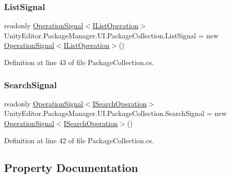 \subsubsection{\texorpdfstring{ListSignal}{ListSignal}}
{\footnotesize\ttfamily readonly \mbox{\hyperlink{class_unity_editor_1_1_package_manager_1_1_u_i_1_1_operation_signal}{Operation\+Signal}}$<$\mbox{\hyperlink{interface_unity_editor_1_1_package_manager_1_1_u_i_1_1_i_list_operation}{I\+List\+Operation}}$>$ Unity\+Editor.\+Package\+Manager.\+U\+I.\+Package\+Collection.\+List\+Signal = new \mbox{\hyperlink{class_unity_editor_1_1_package_manager_1_1_u_i_1_1_operation_signal}{Operation\+Signal}}$<$\mbox{\hyperlink{interface_unity_editor_1_1_package_manager_1_1_u_i_1_1_i_list_operation}{I\+List\+Operation}}$>$()}



Definition at line 43 of file Package\+Collection.\+cs.

\mbox{\label{class_unity_editor_1_1_package_manager_1_1_u_i_1_1_package_collection_a0ae7851281d0246d8c715db1e3b10a63}} 
\subsubsection{\texorpdfstring{SearchSignal}{SearchSignal}}
{\footnotesize\ttfamily readonly \mbox{\hyperlink{class_unity_editor_1_1_package_manager_1_1_u_i_1_1_operation_signal}{Operation\+Signal}}$<$\mbox{\hyperlink{interface_unity_editor_1_1_package_manager_1_1_u_i_1_1_i_search_operation}{I\+Search\+Operation}}$>$ Unity\+Editor.\+Package\+Manager.\+U\+I.\+Package\+Collection.\+Search\+Signal = new \mbox{\hyperlink{class_unity_editor_1_1_package_manager_1_1_u_i_1_1_operation_signal}{Operation\+Signal}}$<$\mbox{\hyperlink{interface_unity_editor_1_1_package_manager_1_1_u_i_1_1_i_search_operation}{I\+Search\+Operation}}$>$()}



Definition at line 42 of file Package\+Collection.\+cs.



\subsection{Property Documentation}
\mbox{\label{class_unity_editor_1_1_package_manager_1_1_u_i_1_1_package_collection_ae9d3d53d670427dfbe398441d7be141e}} 
